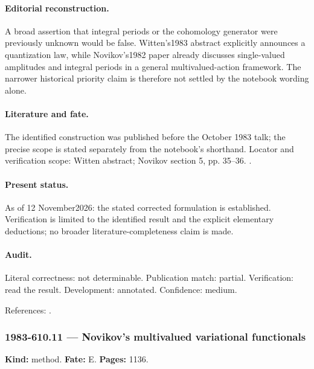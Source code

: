 \paragraph{Editorial reconstruction.} A broad assertion that integral periods or the cohomology generator were previously unknown would be false. Witten's1983 abstract explicitly announces a quantization law, while Novikov's1982 paper already discusses single-valued amplitudes and integral periods in a general multivalued-action framework. The narrower historical priority claim is therefore not settled by the notebook wording alone.

\paragraph{Literature and fate.} The identified construction was published before the October 1983 talk; the precise scope is stated separately from the notebook's shorthand. Locator and verification scope: Witten abstract; Novikov section 5, pp. 35--36. \cite{witten1983global,novikov1982hamiltonian}.

\paragraph{Present status.} As of 12 November2026: the stated corrected formulation is established. Verification is limited to the identified result and the explicit elementary deductions; no broader literature-completeness claim is made.

\paragraph{Audit.} Literal correctness: not determinable. Publication match: partial. Verification: read the result. Development: annotated. Confidence: medium.

\noindent References: \citep{witten1983global,novikov1982hamiltonian}.\par

\subsubsection{1983-610.11 --- Novikov's multivalued variational functionals}

\label{item:1983-610.11}

\noindent\textbf{Kind:} method. \textbf{Fate:} E. \textbf{Pages:} 1136.\par

